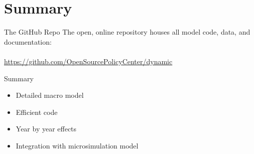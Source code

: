 \documentclass{beamer}
\begin{document}
 


\section{Summary}

  \begin{frame}{The GitHub Repo}
  The open, online repository houses all model code, data, and documentation: \\
  \ \\
\href{https://github.com/OpenSourcePolicyCenter/dynamic}{https://github.com/OpenSourcePolicyCenter/dynamic}
  \end{frame}

  \begin{frame}{Summary}
  \begin{itemize}
      \item Detailed macro model
      \item Efficient code
      \item Year by year effects
      \item Integration with microsimulation model
  \end{itemize}
  \end{frame}
\end{document}
